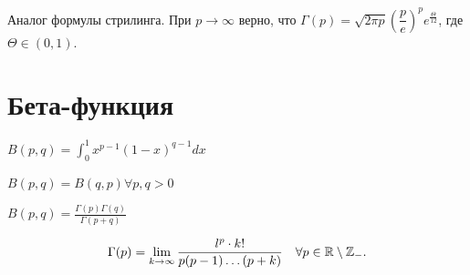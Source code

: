 \begin{note} Аналог формулы стрилинга.
     При $p \to \infty $  верно, что $\Gamma (p) = \sqrt {2 \pi p} \left( \dfrac{p}{e} \right) ^p e^{\frac{\Theta}{12}}$, где $\Theta \in (0, 1)$. 
\end{note}

\section{Бета-функция}

\begin{definition}
    $B(p, q) = \int_0^1 x^{p-1}(1-x)^{q-1}dx$

    $B(p, q) = B(q, p) \forall p, q > 0$

    $B(p, q) = \frac{\Gamma(p)\Gamma(q)}{\Gamma(p + q)}$
\end{definition}

\begin{theorem}

    \[
    \Gamma(p) = \lim_{k \to \infty} \frac{l^p \cdot k!}{p(p-1) \ldots (p+k)} \quad \forall p\in \R\setminus \Z _-
    .\] 
\end{theorem}


